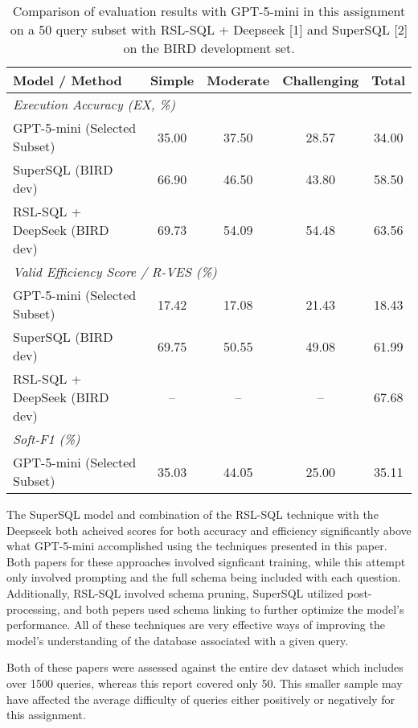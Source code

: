 \documentclass[11pt]{article}
\begin{document}
\begin{table}[h]
\centering
\begin{tabular}{lcccc}
\hline
\textbf{Model / Method} & \textbf{Simple} & \textbf{Moderate} & \textbf{Challenging} & \textbf{Total} \\
\hline
\multicolumn{5}{l}{\textit{Execution Accuracy (EX, \%)}} \\
\hline
GPT-5-mini (Selected Subset)         & 35.00 & 37.50 & 28.57 & 34.00 \\
SuperSQL (BIRD dev)           & 66.90    & 46.50    & 43.80   & 58.50 \\
RSL-SQL + DeepSeek (BIRD dev)         & 69.73    & 54.09    & 54.48    & 63.56 \\
\hline
\multicolumn{5}{l}{\textit{Valid Efficiency Score / R-VES (\%)}} \\
\hline
GPT-5-mini (Selected Subset)         & 17.42 & 17.08 & 21.43 & 18.43 \\
SuperSQL (BIRD dev)           & 69.75    & 50.55    & 49.08    & 61.99 \\
RSL-SQL + DeepSeek (BIRD dev)         & --    & --    & --    & 67.68 \\
\hline
\multicolumn{5}{l}{\textit{Soft-F1 (\%)}} \\
\hline
GPT-5-mini (Selected Subset)          & 35.03 & 44.05 & 25.00 & 35.11 \\
\hline
\end{tabular}
\caption{Comparison of evaluation results with GPT-5-mini in this assignment on a 50 query subset with RSL-SQL + Deepseek [1] and SuperSQL [2] on the BIRD development set.}
\end{table}

The SuperSQL model and combination of the RSL-SQL technique with the Deepseek both acheived scores for both accuracy and efficiency significantly above what GPT-5-mini accomplished using the techniques presented in this paper. Both papers for these approaches involved signficant training, while this attempt only involved prompting and the full schema being included with each question. Additionally, RSL-SQL involved schema pruning, SuperSQL utilized post-processing, and both pepers used schema linking to further optimize the model's performance. All of these techniques are very effective ways of improving the model's understanding of the database associated with a given query.

Both of these papers were assessed against the entire dev dataset which includes over 1500 queries, whereas this report covered only 50. This smaller sample may have affected the average difficulty of queries either positively or negatively for this assignment. 
\end{document}

